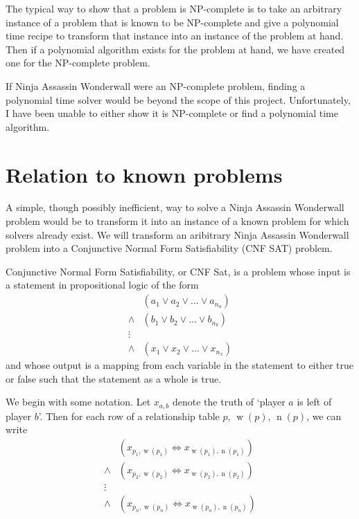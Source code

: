 \documentclass[12pt]{article}
\DeclareMathOperator{\w}{w}
\DeclareMathOperator{\n}{n}
\begin{document}
    The typical way to show that a problem is NP-complete is to take an arbitrary instance of a problem that is known to be NP-complete and give a polynomial time recipe to transform that instance into an instance of the problem at hand. Then if a polynomial algorithm exists for the problem at hand, we have created one for the NP-complete problem. 

    If Ninja Assassin Wonderwall were an NP-complete problem, finding a polynomial time solver would be beyond the scope of this project. Unfortunately, I have been unable to either show it is NP-complete or find a polynomial time algorithm. 

\section{Relation to known problems}
    A simple, though possibly inefficient, way to solve a Ninja Assassin Wonderwall problem would be to transform it into an instance of a known problem for which solvers already exist. We will transform an aribitrary Ninja Assassin Wonderwall problem into a Conjunctive Normal Form Satisfiability (CNF SAT) problem.

    Conjunctive Normal Form Satisfiability, or CNF Sat, is a problem whose input is a statement in propositional logic of the form
        \begin{align*} 
                    & (a_1 \vee a_2 \vee \ldots \vee a_{n_a}) \\
            \wedge  & (b_1 \vee b_2 \vee \ldots \vee b_{n_b})\\
            \vdots  &\\
            \wedge  & (x_1 \vee x_2 \vee \ldots \vee x_{n_x})
        \end{align*}
    and whose output is a mapping from each variable in the statement to either true or false such that the statement as a whole is true. 

    We begin with some notation. Let $x_{a,b}$ denote the truth of `player $a$ is left of player $b$'. Then for each row of a relationship table $p$, $\w(p)$, $\n(p)$, we can write
        \begin{align*}
                    & (x_{p_1, \w(p_1)} \Leftrightarrow x_{\w(p_1), \n(p_1)})\\
            \wedge  & (x_{p_2, \w(p_2)} \Leftrightarrow x_{\w(p_2), \n(p_2)})\\
            \vdots  &\\
            \wedge  & (x_{p_n, \w(p_n)} \Leftrightarrow x_{\w(p_n), \n(p_n)})
        \end{align*}
\end{document}
